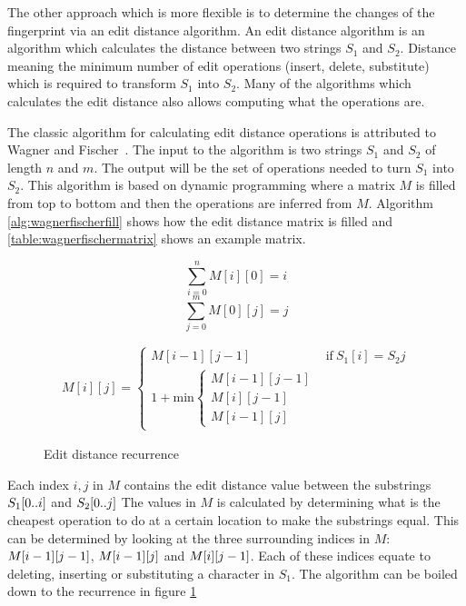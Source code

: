 The other approach which is more flexible is to determine the changes of the fingerprint
via an edit distance algorithm. An edit distance algorithm is an algorithm which
calculates the distance between two strings $S_1$ and $S_2$. Distance meaning the minimum
number of edit operations (insert, delete, substitute) which is required to transform $S_1$
into $S_2$. Many of the algorithms which calculates the edit distance also allows
computing what the operations are.

The classic algorithm for calculating edit distance operations is attributed to Wagner and
Fischer~\cite{WagnerFischer}. The input to the algorithm is two strings $S_1$ and $S_2$ of
length $n$ and $m$. The output will be the set of operations needed to turn $S_1$ into
$S_2$. This algorithm is based on dynamic programming where a matrix $M$ is filled from
top to bottom and then the operations are inferred from $M$. Algorithm
\ref{alg:wagnerfischerfill} shows how the edit distance matrix is filled and
\ref{table:wagnerfischermatrix} shows an example matrix.

\begin{figure}[t]
    \begin{center}
	$$
		\sum^{n}_{i = 0}{M[i][0] = i}
	$$
	$$
		\sum^{m}_{j = 0}{M[0][j] = j}
	$$

	\begin{gather*}
		M[i][j] =
		\begin{cases}
			M[i-1][j-1] & \mathrm{if\ } S_1[i] = S_2{j} \\
			1 + \mathrm{min}
			\begin{cases}
				M[i-1][j-1] \\
				M[i][j-1]   \\
				M[i-1][j]
			\end{cases}
		\end{cases}
	\end{gather*}
	\caption{Edit distance recurrence}
	\label{eq:editdistancerecurrence}
    \end{center}
\end{figure}

Each index $i, j$ in $M$ contains the edit distance value between the substrings
$S_1[{0..i}]$ and $S_2[{0..j}]$ The values in $M$ is calculated by
determining what is the cheapest operation to do at a certain location to make the
substrings equal. This can be determined by looking at the three surrounding indices in
$M$: $M[{i - 1}][{j - 1}]$, $M[{i - 1}][{j}]$ and
$M[{i}][{j - 1}]$. Each of these indices equate to deleting, inserting or
substituting a character in $S_1$. The algorithm can be boiled down to the recurrence in
figure \ref{eq:editdistancerecurrence}


